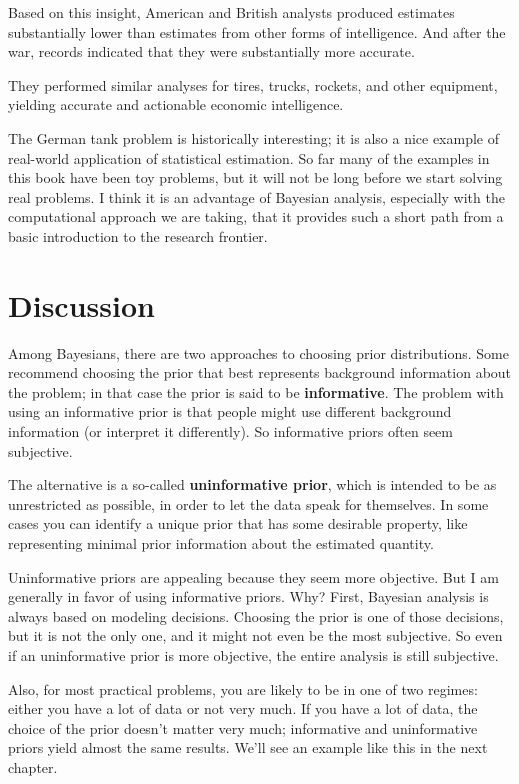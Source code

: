 \documentclass[12pt]{book}
\begin{document}
Based on this insight, American and British analysts produced
estimates substantially lower than estimates from other forms
of intelligence.  And after the war, records indicated that they were
substantially more accurate.

They performed similar analyses for tires, trucks, rockets, and other
equipment, yielding accurate and actionable economic intelligence.

The German tank problem is historically interesting; it is also a nice
example of real-world application of statistical estimation.  So far
many of the examples in this book have been toy problems, but it will
not be long before we start solving real problems.  I think it is an
advantage of Bayesian analysis, especially with the computational
approach we are taking, that it provides such a short path from a
basic introduction to the research frontier.


\section{Discussion}

Among Bayesians, there are two approaches to choosing prior
distributions.  Some recommend choosing the prior that best represents
background information about the problem; in that case the prior
is said to be {\bf informative}.  The problem with using an informative
prior is that people might use different background information (or
interpret it differently).  So informative priors often seem subjective.

The alternative is a so-called {\bf uninformative prior}, which is
intended to be as unrestricted as possible, in order to let the data
speak for themselves.  In some cases you can identify a unique prior
that has some desirable property, like representing minimal prior
information about the estimated quantity.

Uninformative priors are appealing because they seem more
objective.  But I am generally in favor of using informative priors.
Why?  First, Bayesian analysis is always based on
modeling decisions.  Choosing the prior is one of those decisions, but
it is not the only one, and it might not even be the most subjective.
So even if an uninformative prior is more objective, the entire analysis
is still subjective.

Also, for most practical problems, you are likely to be in one of two
regimes: either you have a lot of data or not very much.  If you have
a lot of data, the choice of the prior doesn't matter very much;
informative and uninformative priors yield almost the same results.
We'll see an example like this in the next chapter.
\end{document}
